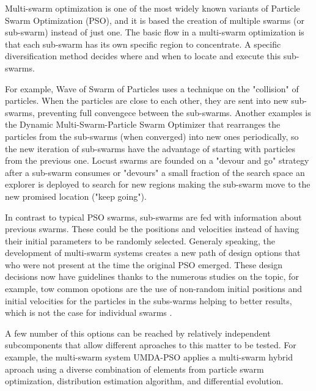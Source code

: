 \documentclass[runningheads]{llncs}
\begin{document}
Multi-swarm optimization is one of the most widely known variants of Particle Swarm Optimization
(PSO), and it is based the creation of multiple swarms (or sub-swarm)
instead of just one. %
The basic flow in
a multi-swarm optimization is that each sub-swarm has its own specific region to concentrate. A specific diversification method decides where and
when to locate and execute this sub-swarms. %

For example, Wave of Swarm of Particles \cite{b6} uses a technique on
the "collision" of particles. %
When the
particles are close to each other, they are sent into new sub-swarms,
preventing full convengece between the sub-swarms. Another examples is the Dynamic Multi-Swarm-Particle
Swarm Optimizer\cite{b7} that rearranges the particles from the sub-swarms
(when converged) into new ones periodically, so the new
iteration of sub-swarms have the advantage of starting with particles from the previous
one. Locust swarms \cite{b8} are founded on a "devour and go" strategy
after a sub-swarm consumes or "devours" a small fraction of the search space an explorer is deployed to search for
new regions making the sub-swarm move to the new promised location ("keep going").

In contrast to typical PSO swarms, sub-swarms are fed with information about
previous swarms. %
These could be the positions and velocities instead of having
their initial parameters to be randomly selected. Generaly speaking, the development of
multi-swarm systems creates a new path of design options that who were not present at the time the original PSO emerged. 
These design decisions now have guidelines thanks to the numerous studies on the topic, for
example, tow common opotions are the use of non-random initial positions and initial velocities for the particles in the subs-warms helping to
better results, which is not the case for individual swarms \cite{b9}.

A few number of this options can be reached by relatively independent
subcomponents that allow different aproaches to this matter to be
tested. For example, the multi-swarm system UMDA-PSO \cite{b10} 
applies a multi-swarm hybrid aproach using a diverse combination of 
elements from particle swarm optimization, distribution estimation 
algorithm, and differential evolution.
\end{document}

